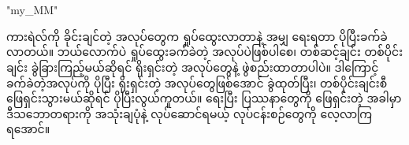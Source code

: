 \chapter{}
\XeTeXlinebreaklocale "my_MM"  %
\begin{sloppypar}
ကားရဲလ်ကို ခိုင်းချင်တဲ့ အလုပ်တွေက ရှုပ်ထွေးလာတာနဲ့ အမျှ \mmprogram ရေးရတာ ပိုပြီးခက်ခဲ လာတယ်။ ဘယ်လောက်ပဲ ရှုပ်ထွေးခက်ခဲတဲ့ အလုပ်ပဲဖြစ်ပါစေ၊ တစ်ဆင့်ချင်း တစ်ပိုင်းချင်း ခွဲခြားကြည့်မယ်ဆိုရင် ရိုးရှင်းတဲ့ အလုပ်တွေနဲ့ ဖွဲစည်းထာတာပါပဲ။ ဒါကြောင့် ခက်ခဲတဲ့အလုပ်ကို ပိုပြီး ရိုးရှင်းတဲ့ အလုပ်တွေဖြစ်အောင် ခွဲထုတ်ပြီး၊ တစ်ပိုင်းချင်းစီ ဖြေရှင်းသွားမယ်ဆိုရင် ပိုပြီးလွယ်ကူတယ်။ \mmprogram ရေးပြီး ပြဿနာတွေကို ဖြေရှင်းတဲ့ အခါမှာ ဒီသဘောတရားကို အသုံးချပုံနဲ့ လုပ်ဆောင်ရမယ့် လုပ်ငန်းစဉ်တွေကို လေ့လာကြရအောင်။


\end{sloppypar}
